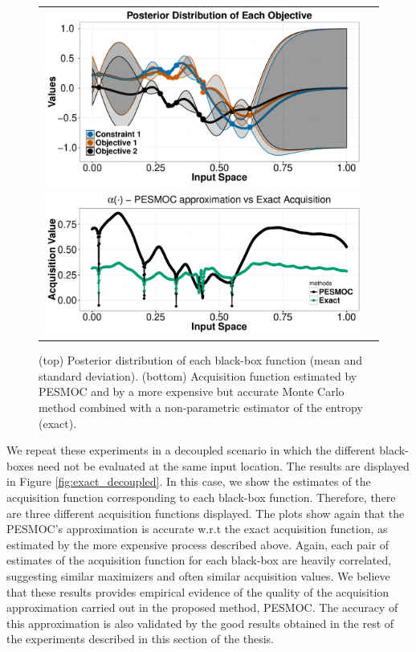 \begin{figure}[htb]
\begin{center}
\begin{tabular}{cc}
        \includegraphics[width=0.7\linewidth]{Figures/acquisition/plot_posterior_coupled.pdf} \\
        \includegraphics[width=0.7\linewidth]{Figures/acquisition/plot_acq_coupled.pdf}
\end{tabular}
\caption{(top) Posterior distribution of each black-box function
        (mean and standard deviation). (bottom) Acquisition function estimated by PESMOC and by a more expensive
        but accurate Monte Carlo method combined with a non-parametric estimator of the entropy (exact).
        }
        \label{fig:exact_coupled}
\end{center}
\end{figure}

We repeat these experiments in a decoupled scenario in which the different black-boxes need not be evaluated
at the same input location. The results are displayed in Figure \ref{fig:exact_decoupled}. In this case, we
show the estimates of the acquisition function corresponding to each black-box function. Therefore,
there are three different acquisition functions displayed. The plots show
again that the PESMOC's approximation is accurate w.r.t the exact acquisition function, as  estimated by the
more expensive process described above. Again, each pair of estimates of the acquisition function for each
black-box are heavily correlated, suggesting similar maximizers and often similar acquisition values. We
believe that these results provides empirical evidence of the quality of the acquisition approximation carried out
in the proposed method, PESMOC. The accuracy of this approximation is also validated by the good results
obtained in the rest of the experiments described in this section of the thesis.

